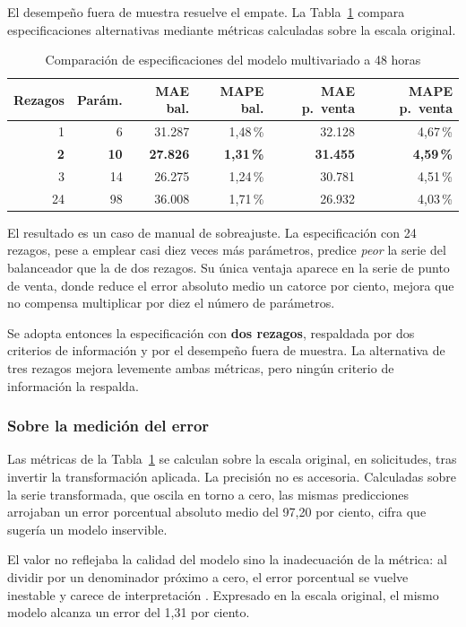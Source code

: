 El desempeño fuera de muestra resuelve el empate. La Tabla~\ref{tab:var_comp} compara
especificaciones alternativas mediante métricas calculadas sobre la escala original.

\begin{table}[htbp]
\centering
\caption{Comparación de especificaciones del modelo multivariado a 48 horas}
\label{tab:var_comp}
\small
\begin{tabular}{rrrrrr}
\toprule
\textbf{Rezagos} & \textbf{Parám.} & \textbf{MAE bal.} & \textbf{MAPE bal.} & \textbf{MAE p.\ venta} & \textbf{MAPE p.\ venta} \\
\midrule
1 & 6 & 31.287 & 1,48\,\% & 32.128 & 4,67\,\% \\
\textbf{2} & \textbf{10} & \textbf{27.826} & \textbf{1,31\,\%} & \textbf{31.455} & \textbf{4,59\,\%} \\
3 & 14 & 26.275 & 1,24\,\% & 30.781 & 4,51\,\% \\
24 & 98 & 36.008 & 1,71\,\% & 26.932 & 4,03\,\% \\
\bottomrule
\end{tabular}
\end{table}

El resultado es un caso de manual de sobreajuste. La especificación con 24 rezagos, pese
a emplear casi diez veces más parámetros, predice \textit{peor} la serie del balanceador que la
de dos rezagos. Su única ventaja aparece en la serie de punto de venta, donde reduce el error absoluto
medio un catorce por ciento, mejora que no compensa multiplicar por diez el número de parámetros.

Se adopta entonces la especificación con \textbf{dos rezagos}, respaldada por dos
criterios de información y por el desempeño fuera de muestra. La alternativa de tres rezagos
mejora levemente ambas métricas, pero ningún criterio de información la respalda.

\subsubsection{Sobre la medición del error}

Las métricas de la Tabla~\ref{tab:var_comp} se calculan sobre la escala original, en
solicitudes, tras invertir la transformación aplicada. La precisión no es accesoria. Calculadas
sobre la serie transformada, que oscila en torno a cero, las mismas predicciones arrojaban un
error porcentual absoluto medio del 97,20 por ciento, cifra que sugería un modelo inservible.

El valor no reflejaba la calidad del modelo sino la inadecuación de la métrica: al dividir por
un denominador próximo a cero, el error porcentual se vuelve inestable y carece de
interpretación \parencite{hyndman2006}. Expresado en la escala original, el mismo modelo
alcanza un error del 1,31 por ciento.

